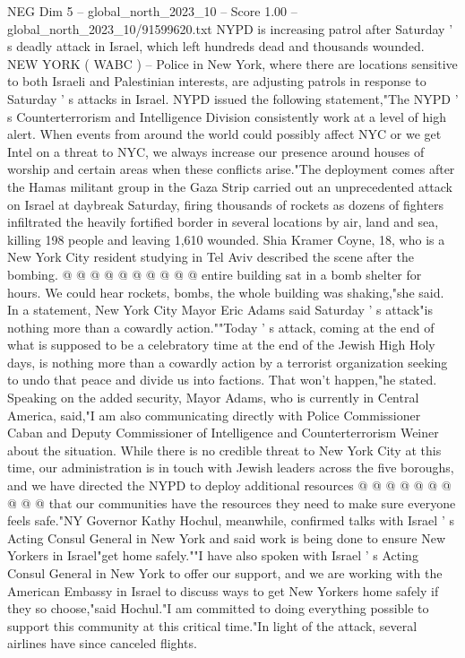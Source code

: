 \begin{textsample}{NEG Dim 5 – global\_north\_2023\_10 – Score 1.00 – global\_north\_2023\_10/91599620.txt}  \label{ex:f5_neg_028}
NYPD is increasing patrol after Saturday ' s deadly attack in Israel, which left hundreds dead and thousands wounded.
NEW YORK ( WABC ) -- Police in New York, where there are locations sensitive to both Israeli and Palestinian interests, are adjusting patrols in response to Saturday ' s attacks in Israel.
NYPD issued the following statement,"The NYPD ' s Counterterrorism and Intelligence Division consistently work at a level of high alert.
When events from around the world could possibly affect NYC or we get Intel on a threat to NYC, we always increase our presence around houses of worship and certain areas when these conflicts arise."The deployment comes after the Hamas militant group in the Gaza Strip carried out an unprecedented attack on Israel at daybreak Saturday, firing thousands of rockets as dozens of fighters infiltrated the heavily fortified border in several locations by air, land and sea, killing 198 people and leaving 1,610 wounded.
Shia Kramer Coyne, 18, who is a New York City resident studying in Tel Aviv described the scene after the bombing. @ @ @ @ @ @ @ @ @ @ entire building sat in a bomb shelter for hours.
We could hear rockets, bombs, the whole building was shaking,"she said.
In a statement, New York City Mayor Eric Adams said Saturday ' s attack"is nothing more than a cowardly action.""Today ' s attack, coming at the end of what is supposed to be a celebratory time at the end of the Jewish High Holy days, is nothing more than a cowardly action by a terrorist organization seeking to undo that peace and divide us into factions.
That won't happen,"he stated.
Speaking on the added security, Mayor Adams, who is currently in Central America, said,"I am also communicating directly with Police Commissioner Caban and Deputy Commissioner of Intelligence and Counterterrorism Weiner about the situation.
While there is no credible threat to New York City at this time, our administration is in touch with Jewish leaders across the five boroughs, and we have directed the NYPD to deploy additional resources @ @ @ @ @ @ @ @ @ @ that our communities have the resources they need to make sure everyone feels safe."NY Governor Kathy Hochul, meanwhile, confirmed talks with Israel ' s Acting Consul General in New York and said work is being done to ensure New Yorkers in Israel"get home safely.""I have also spoken with Israel ' s Acting Consul General in New York to offer our support, and we are working with the American Embassy in Israel to discuss ways to get New Yorkers home safely if they so choose,"said Hochul."I am committed to doing everything possible to support this community at this critical time."In light of the attack, several airlines have since canceled flights.

\end{textsample}
